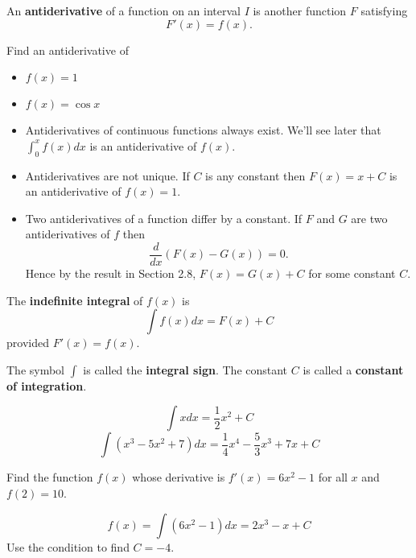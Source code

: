 \documentclass[../main.tex]{subfiles}
\begin{document}
An \textbf{antiderivative} of a function on an interval $I$ is another function $F$ satisfying
\[
    F'(x) = f(x).
\]

\begin{example}
    Find an antiderivative of
    \begin{itemize}
        \item $f(x) = 1$
        \item $f(x) = \cos x$
    \end{itemize}
\end{example}

\begin{itemize}
    \item Antiderivatives of continuous functions always exist. We'll see later that $\int_0^x f(x) dx$ is an antiderivative of $f(x)$.
    \item Antiderivatives are not unique. If $C$ is any constant then $F(x) = x + C$ is an antiderivative of $f(x) = 1$.
    \item Two antiderivatives of a function differ by a constant. If $F$ and $G$ are two antiderivatives of $f$ then
    \[
        \frac{d}{dx} (F(x) - G(x)) = 0.
    \]
    Hence by the result in Section 2.8, $F(x) = G(x) + C$ for some constant $C$.
\end{itemize}


The \textbf{indefinite integral} of $f(x)$ is
\[
    \int f(x) dx = F(x) + C
\]
provided $F'(x) = f(x)$.

The symbol $\int$ is called the \textbf{integral sign}. The constant $C$ is called a \textbf{constant of integration}.
\begin{example}
    \[
        \int x dx = \frac{1}{2}x^2 + C
    \]
    \[
        \int (x^3 - 5x^2 +7) dx = \frac{1}{4}x^4 - \frac{5}{3}x^3 + 7x + C
    \]
\end{example}

\begin{example}
    Find the function $f(x)$ whose derivative is $f'(x) = 6 x^2 - 1$ for all $x$ and $f(2) = 10$.
\end{example}
\begin{solution}
    \[
        f(x) = \int (6x^2 - 1) dx = 2x^3 - x + C
    \]
    Use the condition to find $C = -4$.
\end{solution}
\end{document}
